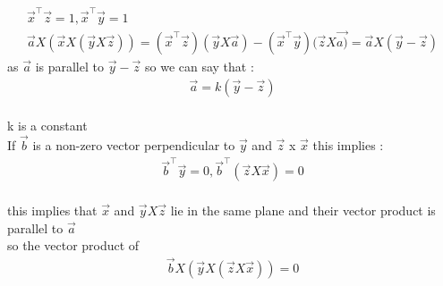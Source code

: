 \documentclass[journal,12pt,onecolumn]{IEEEtran}
\begin{document}
\begin{align*}
    \vec{x}^\top\vec{z}=1,\vec{x}^\top\vec{y}=1
    \\
    \vec{a}X(\vec{x}X(\vec{y} X \vec{z}))=(\vec{x}^\top\vec{z})(\vec{y}X\vec{a})-(\vec{x}^\top\vec{y})(\vec{z}X\vec{a)}=\vec{a}X(\vec{y}-\vec{z})
\end{align*}
as $\vec{a}$ is parallel to $\vec{y}-\vec{z}$ so we can say that :
\begin{align*}
    \vec{a}=k(\vec{y}-\vec{z})
\end{align*}
\\
k is a  constant
\\
If $\vec{b}$ is a non-zero vector perpendicular to $\vec{y}$ and $\vec{z}$ x $\vec{x}$ this implies :
\\

\begin{align*}
    \vec{b}^\top\vec{y}=0, \vec{b}^\top(\vec{z} X \vec{x})=0
\end{align*}
\\
this implies that  $\vec{x}$ and $\vec{y} X \vec{z}$ lie in the same plane and their vector product is parallel to $\vec{a}$
\\
so the vector product of 
\\
\begin{align*}
    \vec{b}X(\vec{y}X(\vec{z} X \vec{x}))=0
\end{align*}
\\
\end{document}
